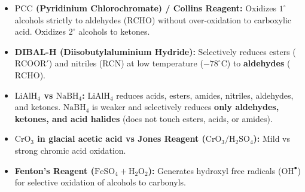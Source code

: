 \documentclass[10pt,a4paper]{article}
\begin{document}
\begin{ncertbox}
\begin{itemize}
  \item \textbf{$\mathrm{PCC}$ (Pyridinium Chlorochromate) / Collins Reagent:} Oxidizes $1^\circ$ alcohols strictly to aldehydes ($\mathrm{RCHO}$) without over-oxidation to carboxylic acid. Oxidizes $2^\circ$ alcohols to ketones.
  \item \textbf{DIBAL-H (Diisobutylaluminium Hydride):} Selectively reduces esters ($\mathrm{RCOOR'}$) and nitriles ($\mathrm{RCN}$) at low temperature ($-78^\circ\mathrm{C}$) to \textbf{aldehydes} ($\mathrm{RCHO}$).
  \item \textbf{$\mathrm{LiAlH}_4$ vs $\mathrm{NaBH}_4$:} $\mathrm{LiAlH}_4$ reduces acids, esters, amides, nitriles, aldehydes, and ketones. $\mathrm{NaBH}_4$ is weaker and selectively reduces \textbf{only aldehydes, ketones, and acid halides} (does not touch esters, acids, or amides).
  \item \textbf{$\mathrm{CrO_3}$ in glacial acetic acid vs Jones Reagent ($\mathrm{CrO_3 / H_2SO_4}$):} Mild vs strong chromic acid oxidation.
  \item \textbf{Fenton's Reagent ($\mathrm{FeSO_4 + H_2O_2}$):} Generates hydroxyl free radicals ($\mathrm{OH}^\bullet$) for selective oxidation of alcohols to carbonyls.
\end{itemize}
\end{ncertbox}
\end{document}
